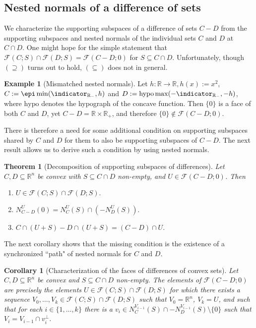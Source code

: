 \documentclass{article}
\theoremstyle{plain}
\newtheorem{theorem}{Theorem}[section]
\newtheorem{corollary}{Corollary}[section]
\theoremstyle{definition}
\newtheorem{example}{Example}[section]
\theoremstyle{remark}
\begin{document}
\subsection{Nested normals of a difference of sets}
\label{loc:narrative_for_conditional_subdifferentials.statement.nested_normals_of_a_difference_of_sets}
We characterize the supporting subspaces of a difference of sets $C-D$ from the
supporting subspaces and nested normals of the individual sets $C$ and $D$ at $C
\cap D$. One might hope for the simple statement that $\mathcal{F}(C;S) \cap
\mathcal{F}(D;S) = \mathcal{F}(C-D;0)$ for $S \subseteq C \cap D$. Unfortunately, though $(\supseteq)$
turns out to hold, $(\subseteq)$ does not in general. 
\begin{example}[Mismatched nested normals]
\label{loc:example_mismatched_nested_normals.statement}
Let $h:\mathbb{R} \to  \mathbb{R}, h(x):= x^2$, $C := \epi\min(\indicator_{\mathbb{R}_{-}},  h)$
and $D :=  \mathrm{hypo}\max(-\indicator_{\mathbb{R}_{-}},  -h)$, where $\mathrm{hypo}$ denotes the hypograph of the concave function. Then $\{0\}$ is a
face of both $C$ and $D$, yet $C-D = \mathbb{R} \times \mathbb{R}_{+}$, and
therefore $\{0\} \notin \mathcal{F}(C-D;0)$. 
\end{example}
There is therefore a need for some
additional condition on supporting subspaces
shared by $C$ and $D$ for them to also be
supporting subspaces of $C-D$. The next result
allows us to derive such a condition by using nested normals.
\begin{theorem}[Decomposition of supporting subspaces of differences]
\label{loc:decomposition_of_supporting_subspaces_of_differences.statement}
Let $C, D \subseteq \mathbb{R}^n$ be convex with $S \subseteq C \cap D$ non-empty, and $U \in \mathcal{F}(C-D;0)$. Then
\begin{enumerate}
\item $U \in \mathcal{F}(C;S) \cap \mathcal{F}(D;S).$
\item $N^U_{C-D}(0) = N^U_C(S) \cap (-N^U_D(S)).$
\item $C \cap (U+S) - D \cap (U+S) = (C-D) \cap U.$
\end{enumerate}
\end{theorem}
The next corollary shows that the missing condition is the existence of a synchronized ``path" of nested normals for $C$ and $D$.
\begin{corollary}[Characterization of the faces of differences of convex sets]
\label{loc:characterization_of_the_faces_of_differences_of_convex_sets.statement}
Let $C, D \subseteq \mathbb{R}^n$ be convex and $S \subseteq C \cap D$ non-empty.
The elements of $\mathcal{F}(C-D;0)$ are precisely the elements 
$U \in \mathcal{F}(C;S) \cap \mathcal{F}(D;S)$
for which there exists a sequence $V_0, \ldots, V_k \in \mathcal{F}(C;S) \cap  \mathcal{F}(D;S)$
such that $V_0=\mathbb{R}^n$, $V_k = U$, and
such that for each $i \in \{ 1, \ldots,k\}$ there is a $v_i \in N_C^{V_{i-1}}(S) \cap -N_D^{V_{i-1}}(S) \setminus \{0\}$ such that $V_i = V_{i-1} \cap v_i^\perp$.
\end{corollary}
\end{document}
